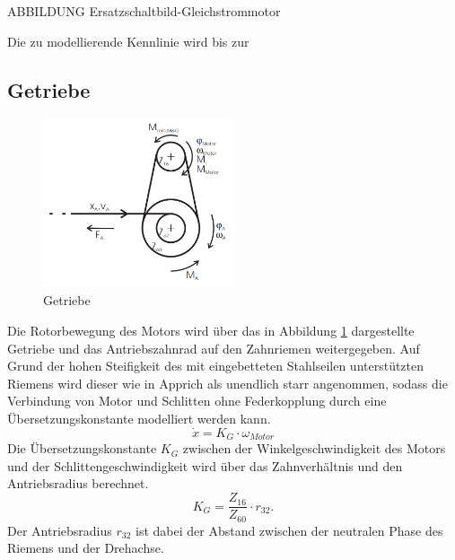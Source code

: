 ABBILDUNG Ersatzschaltbild-Gleichstrommotor

Die zu modellierende Kennlinie wird bis zur 

\subsection{Getriebe}

\begin{figure}[htbp]
	\centering
		\includegraphics[width=0.50\textwidth]{Bilder/Modellierung/Getriebe.PNG}
	\caption{Getriebe \cite{franke}}
	\label{fig:Getriebe}
\end{figure}

Die Rotorbewegung des Motors wird über das in Abbildung \ref{fig:Getriebe} dargestellte Getriebe und das Antriebszahnrad auf den Zahnriemen weitergegeben. Auf Grund der hohen Steifigkeit des mit eingebetteten Stahlseilen unterstützten Riemens wird dieser wie in Apprich \cite{apprich} als unendlich starr angenommen, sodass die Verbindung von Motor und Schlitten ohne Federkopplung durch eine Übersetzungskonstante modelliert werden kann.
\[
	\dot{x} = K_G \cdot \omega_{Motor}
\]
 Die Übersetzungskonstante $K_G$ zwischen der Winkelgeschwindigkeit des Motors und der Schlittengeschwindigkeit wird über das Zahnverhältnis und den Antriebsradius berechnet.
\[
	K_G =  \frac{Z_{16}}{Z_{60}} \cdot r_{32} .
\]
Der Antriebsradius $r_{32}$ ist dabei der Abstand zwischen der neutralen Phase des Riemens und der Drehachse.